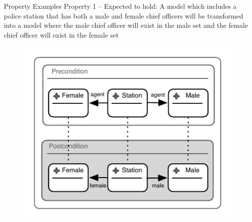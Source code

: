 \documentclass[xcolor=dvipsnames, 14pt]{beamer}
\begin{document}
\begin{frame}{Property Examples}
Property 1 -- Expected to hold: \small A model which includes a police station that has
both a male and female chief officers will be transformed into a model where the male
chief officer will exist in the male set and the female chief officer will exist in the female
set
\normalsize

\begin{figure}[htb]
        \centering
                \centering
                \includegraphics[height=.7\textheight]{../figures/policestation_dsltrans/satisfied.pdf}
                \label{fig:dsltrans_prop1}

\end{figure}
\end{frame}
\end{document}
